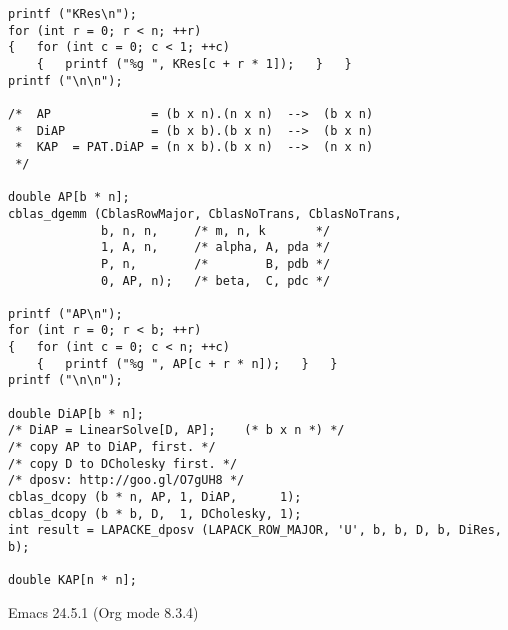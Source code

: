 \documentclass[10pt,oneside,x11names]{article}
\begin{document}
\begin{verbatim}
printf ("KRes\n");
for (int r = 0; r < n; ++r)
{   for (int c = 0; c < 1; ++c)
    {   printf ("%g ", KRes[c + r * 1]);   }   }
printf ("\n\n");

/*  AP              = (b x n).(n x n)  -->  (b x n)
 *  DiAP            = (b x b).(b x n)  -->  (b x n)
 *  KAP  = PAT.DiAP = (n x b).(b x n)  -->  (n x n)
 */

double AP[b * n];
cblas_dgemm (CblasRowMajor, CblasNoTrans, CblasNoTrans,
             b, n, n,     /* m, n, k       */
             1, A, n,     /* alpha, A, pda */
             P, n,        /*        B, pdb */
             0, AP, n);   /* beta,  C, pdc */

printf ("AP\n");
for (int r = 0; r < b; ++r)
{   for (int c = 0; c < n; ++c)
    {   printf ("%g ", AP[c + r * n]);   }   }
printf ("\n\n");

double DiAP[b * n];
/* DiAP = LinearSolve[D, AP];    (* b x n *) */
/* copy AP to DiAP, first. */
/* copy D to DCholesky first. */
/* dposv: http://goo.gl/O7gUH8 */
cblas_dcopy (b * n, AP, 1, DiAP,      1);
cblas_dcopy (b * b, D,  1, DCholesky, 1);
int result = LAPACKE_dposv (LAPACK_ROW_MAJOR, 'U', b, b, D, b, DiRes, b);

double KAP[n * n];
\end{verbatim}
Emacs 24.5.1 (Org mode 8.3.4)
\end{document}
